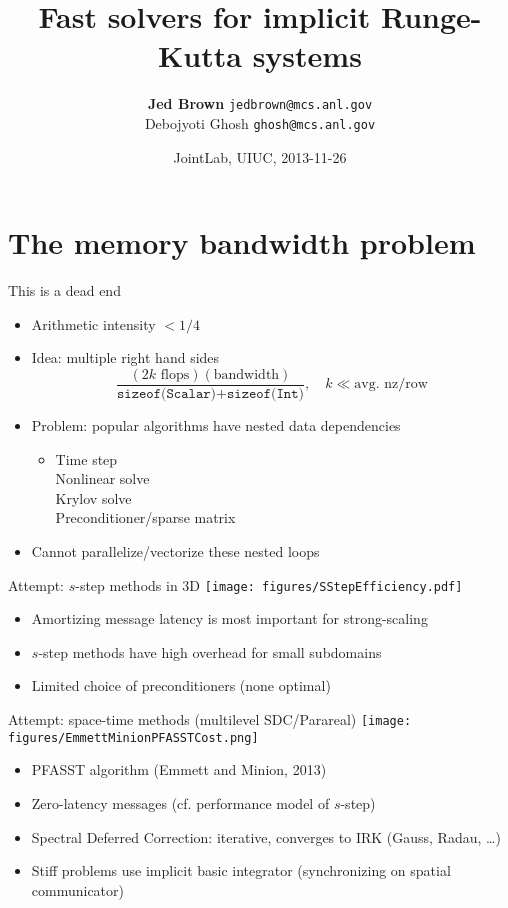 \documentclass{beamer}
\title{Fast solvers for implicit Runge-Kutta systems}
\author{{\bf Jed Brown} \texttt{jedbrown@mcs.anl.gov} \\
  Debojyoti Ghosh \texttt{ghosh@mcs.anl.gov}
}
\institute
{
  Mathematics and Computer Science Division \\ Argonne National Laboratory
}
\date{JointLab, UIUC, 2013-11-26}
\begin{document}
\lstset{language=C}
\normalem

\begin{frame}
  \titlepage
\end{frame}

\section{The memory bandwidth problem}


\begin{frame}{This is a dead end}
  \begin{itemize}
  \item Arithmetic intensity $< 1/4$
  \item Idea: multiple right hand sides
    \begin{equation*}
      \frac{(2 k \text{ flops})(\text{bandwidth})}{\texttt{sizeof(Scalar)} + \texttt{sizeof(Int)}}, \quad k \ll \text{avg. nz/row}
    \end{equation*}
  \item Problem: popular algorithms have nested data dependencies
    \begin{itemize}
    \item Time step \\
      \qquad Nonlinear solve \\
      \qquad \qquad Krylov solve \\
      \qquad \qquad \qquad Preconditioner/sparse matrix
    \end{itemize}
  \item Cannot parallelize/vectorize these nested loops
  \end{itemize}
\end{frame}

\begin{frame}{Attempt: $s$-step methods in 3D}
  \texttt{[image: figures/SStepEfficiency.pdf]}
  \begin{itemize}
  \item Amortizing message latency is most important for strong-scaling
  \item $s$-step methods have high overhead for small subdomains
  \item Limited choice of preconditioners (none optimal)
  \end{itemize}
\end{frame}

\begin{frame}{Attempt: space-time methods (multilevel SDC/Parareal)}
  \texttt{[image: figures/EmmettMinionPFASSTCost.png]}
  \begin{itemize}
  \item PFASST algorithm (Emmett and Minion, 2013)
  \item Zero-latency messages (cf. performance model of $s$-step)
  \item Spectral Deferred Correction: iterative, converges to IRK (Gauss, Radau, \ldots)
  \item Stiff problems use implicit basic integrator (synchronizing on spatial communicator)
  \end{itemize}
\end{frame}
\end{document}
